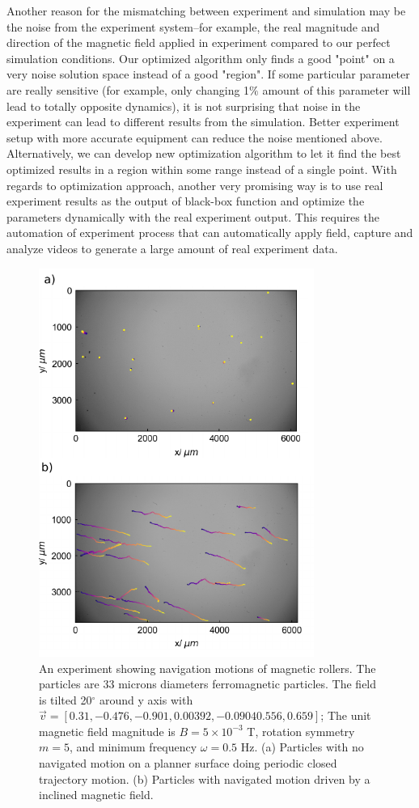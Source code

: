  Another reason for the mismatching between experiment and simulation may be the noise from the experiment system--for example, the real magnitude and direction of the magnetic field applied in experiment compared to our perfect simulation conditions. Our optimized algorithm only finds a good  "point" on a very noise solution space instead of a good "region". If some particular parameter are really sensitive (for example, only changing 1$\%$ amount of this parameter will lead to totally opposite dynamics), it is not surprising that noise in the experiment can lead to different results from the simulation. Better experiment setup with more accurate equipment can reduce the noise mentioned above. Alternatively, we can develop new optimization algorithm to let it find the best optimized results in a region within some range instead of a single point.  With regards to optimization approach, another very promising way is to use real experiment results as the output of black-box function and optimize the parameters dynamically with the real experiment output. This requires the automation of experiment process that can automatically apply field, capture and analyze  videos to generate a large amount of real experiment data\autocite{oulmas20183d}.

 \begin{figure}[p]
\centering
\includegraphics[width=9cm]{figures/5_6.pdf}
\caption{An experiment showing navigation motions of magnetic rollers. The particles are 33 microns diameters ferromagnetic particles. The field is tilted 20$^{\circ}$ around y axis with $\vec{v}=[0.31,-0.476,-0.901,0.00392, -0.0904
0.556,0.659]$; The unit magnetic field magnitude is $B=5 \times 10^{-3}$ T, rotation symmetry $m=5$, and minimum frequency $\omega=0.5$ Hz. (a) Particles with no navigated motion on a planner surface doing periodic closed trajectory motion.  (b) Particles with navigated motion driven by a inclined magnetic field.}
\label{fig:5.6}
\end{figure}
